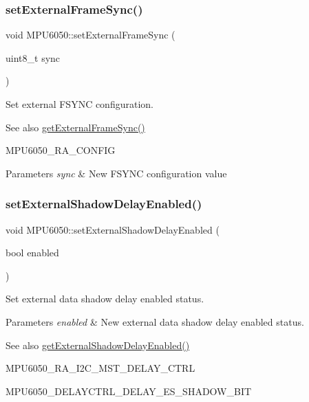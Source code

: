 \subsubsection{\texorpdfstring{setExternalFrameSync()}{setExternalFrameSync()}}
{\footnotesize\ttfamily void M\+P\+U6050\+::set\+External\+Frame\+Sync (\begin{DoxyParamCaption}\item[{uint8\+\_\+t}]{sync }\end{DoxyParamCaption})}

Set external F\+S\+Y\+NC configuration. \begin{DoxySeeAlso}{See also}
\mbox{\hyperlink{class_m_p_u6050_a902a7d486cd6ac21f8c378634dc6f59a}{get\+External\+Frame\+Sync()}} 

M\+P\+U6050\+\_\+\+R\+A\+\_\+\+C\+O\+N\+F\+IG 
\end{DoxySeeAlso}

\begin{DoxyParams}{Parameters}
{\em sync} & New F\+S\+Y\+NC configuration value \\
\hline
\end{DoxyParams}
\mbox{\label{class_m_p_u6050_a9160193d883871037c6535a9d3e02ee2}} 
\subsubsection{\texorpdfstring{setExternalShadowDelayEnabled()}{setExternalShadowDelayEnabled()}}
{\footnotesize\ttfamily void M\+P\+U6050\+::set\+External\+Shadow\+Delay\+Enabled (\begin{DoxyParamCaption}\item[{bool}]{enabled }\end{DoxyParamCaption})}

Set external data shadow delay enabled status. 
\begin{DoxyParams}{Parameters}
{\em enabled} & New external data shadow delay enabled status. \\
\hline
\end{DoxyParams}
\begin{DoxySeeAlso}{See also}
\mbox{\hyperlink{class_m_p_u6050_a0e5cb13838298609b5260fd1558f8c92}{get\+External\+Shadow\+Delay\+Enabled()}} 

M\+P\+U6050\+\_\+\+R\+A\+\_\+\+I2\+C\+\_\+\+M\+S\+T\+\_\+\+D\+E\+L\+A\+Y\+\_\+\+C\+T\+RL 

M\+P\+U6050\+\_\+\+D\+E\+L\+A\+Y\+C\+T\+R\+L\+\_\+\+D\+E\+L\+A\+Y\+\_\+\+E\+S\+\_\+\+S\+H\+A\+D\+O\+W\+\_\+\+B\+IT 
\end{DoxySeeAlso}
\mbox{\label{class_m_p_u6050_a66da5bc38aa82404117d1ef5306c951a}} 
